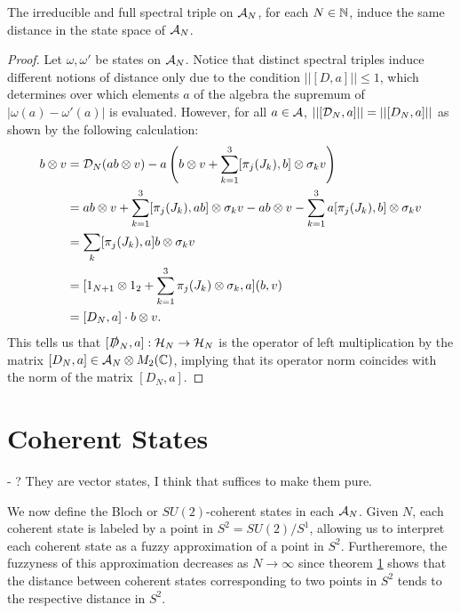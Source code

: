 \begin{theorem}
The irreducible and full spectral triple on $\mathcal A_N$, for each $N \in \mathbb{N}$, induce the same distance in the state space of $\mathcal A_N$.
\end{theorem}
\begin{proof}
Let $\omega, \omega'$ be states on $\mathcal A_N$. Notice that distinct spectral triples induce different notions of distance only due to the condition $||[D, a]|| \leq 1$, which determines over which elements $a$ of the algebra the supremum of $|\omega(a) - \omega'(a)|$ is evaluated. However, for all $a \in \mathcal A$, $||[\mathcal D_N, a]|| = ||[D_N, a]||$ as shown by the following calculation:
\begin{align*}
    [\dcal, a]b \otimes v &= \dcal_N(ab \otimes v) - a\left(b \otimes v + \sum_{k = 1}^3 [\pi_j(J_k), b] \otimes \sigma_k v\right)\\
        &= ab \otimes v + \sum_{k = 1}^3[\pi_j(J_k), ab] \otimes \sigma_k v - ab \otimes v - \sum_{k = 1}^3 a[\pi_j(J_k), b]\otimes \sigma_k v\\
        &= \sum_k [\pi_j(J_k), a]b \otimes \sigma_k v\\
        &= [1_{N+1} \otimes 1_2 + \sum_{k = 1}^3 \pi_j(J_k)\otimes \sigma_k, a](b, v)\\
        &= [D_N, a] \cdot b \otimes v.
\end{align*}
This tells us that $[\slashed D_N, a]: \mathcal H_N \to \mathcal H_N$ is the operator of left multiplication by the matrix $[D_N, a] \in \mathcal A_N \otimes M_2(\mathbb{C})$, implying that its operator norm coincides with the norm of the matrix $[D_N, a]$.
\end{proof}

\section{Coherent States}
 {\color{gray}

- ? They are vector states, I think that suffices to make them pure.
}

We now define the Bloch or $SU(2)$-coherent states in each $\mathcal A_N$. Given $N$, each coherent state is labeled by a point in $S^2 = SU(2) / S^1$, allowing us to interpret each coherent state as a fuzzy approximation of a point in $S^2$. Furtheremore, the fuzzyness of this approximation decreases as $N \to \infty$ since theorem \ref{} shows that the distance between coherent states corresponding to two points in $S^2$ tends to the respective distance in $S^2$. 

